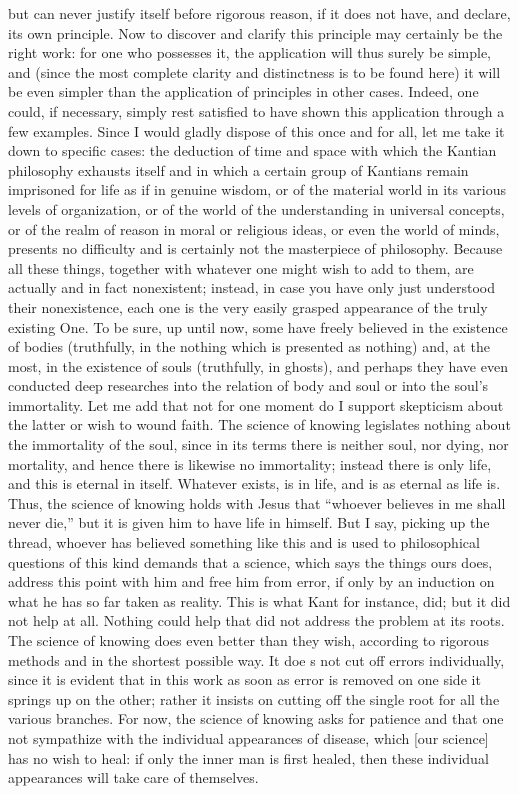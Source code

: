 but can never justify itself before rigorous reason,
if it does not have, and declare, its own principle.
Now to discover and clarify this principle may 
certainly be the right work:
for one who possesses it,
the application will thus surely be simple,
and (since the most complete clarity and distinctness is
to be found here)
it will be even simpler than the
application of principles in other cases.
Indeed, one could, if necessary,
simply rest satisfied to have shown
this application through a few examples.
Since I would gladly dispose of this once and for all,
let me take it down to specific cases:
the deduction of time and space
with which the Kantian philosophy exhausts itself
and in which a certain group of Kantians remain
imprisoned for life as if in genuine wisdom,
or of the material world in its various levels of organization,
or of the world of the understanding in universal concepts,
or of the realm of reason in moral or religious ideas,
or even the world of minds,
presents no difficulty and is certainly
not the masterpiece of philosophy.
Because all these things,
together with whatever one might wish to add to them,
are actually and in fact nonexistent;
instead, in case you have only just understood their nonexistence,
each one is the very easily grasped appearance
of the truly existing One.
To be sure, up until now,
some have freely believed in the existence of bodies
(truthfully, in the nothing which is presented as nothing)
and, at the most, in the existence of souls
(truthfully, in ghosts),
and perhaps they have even conducted
deep researches into the relation of body and soul
or into the soul's immortality.
Let me add that not for one moment do I support
skepticism about the latter or wish to wound faith.
The science of knowing legislates
nothing about the immortality of the soul,
since in its terms there is
neither soul, nor dying, nor mortality,
and hence there is likewise no immortality;
instead there is only life,
and this is eternal in itself.
Whatever exists, is in life,
and is as eternal as life is.
Thus, the science of knowing holds with Jesus that
“whoever believes in me shall never die,”
but it is given him to have life in himself.
But I say, picking up the thread,
whoever has believed something like this
and is used to philosophical questions of this kind
demands that a science, which says the things ours does,
address this point with him and free him from error,
if only by an induction on what he has so far taken as reality.
This is what Kant for instance, did;
but it did not help at all.
Nothing could help that did not address the problem at its roots.
The science of knowing does even better than they wish,
according to rigorous methods and in the shortest possible way.
It doe s not cut off errors individually,
since it is evident that in this work
as soon as error is removed on one side
it springs up on the other;
rather it insists on cutting off
the single root for all the various branches.
For now, the science of knowing asks for patience
and that one not sympathize with
the individual appearances of disease,
which [our science] has no wish to heal:
if only the inner man is first healed,
then these individual appearances
will take care of themselves.

